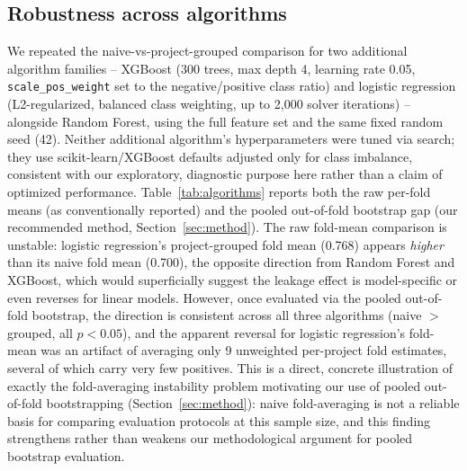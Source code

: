 \documentclass[preprint,12pt]{elsarticle}
\begin{document}
\subsection{Robustness across algorithms}
\label{sec:algcompare}
We repeated the naive-vs-project-grouped comparison for two additional algorithm families -- XGBoost (300 trees, max depth 4, learning rate 0.05, \texttt{scale\_pos\_weight} set to the negative/positive class ratio) and logistic regression (L2-regularized, balanced class weighting, up to 2{,}000 solver iterations) -- alongside Random Forest, using the full feature set and the same fixed random seed (42). Neither additional algorithm's hyperparameters were tuned via search; they use scikit-learn/XGBoost defaults adjusted only for class imbalance, consistent with our exploratory, diagnostic purpose here rather than a claim of optimized performance. Table~\ref{tab:algorithms} reports both the raw per-fold means (as conventionally reported) and the pooled out-of-fold bootstrap gap (our recommended method, Section~\ref{sec:method}). The raw fold-mean comparison is unstable: logistic regression's project-grouped fold mean (0.768) appears \emph{higher} than its naive fold mean (0.700), the opposite direction from Random Forest and XGBoost, which would superficially suggest the leakage effect is model-specific or even reverses for linear models. However, once evaluated via the pooled out-of-fold bootstrap, the direction is consistent across all three algorithms (naive $>$ grouped, all $p<0.05$), and the apparent reversal for logistic regression's fold-mean was an artifact of averaging only 9 unweighted per-project fold estimates, several of which carry very few positives. This is a direct, concrete illustration of exactly the fold-averaging instability problem motivating our use of pooled out-of-fold bootstrapping (Section~\ref{sec:method}): naive fold-averaging is not a reliable basis for comparing evaluation protocols at this sample size, and this finding strengthens rather than weakens our methodological argument for pooled bootstrap evaluation.

\begin{table}[htbp]
\centering
\caption{Algorithm comparison. ``Fold-mean'' columns are simple averages across per-fold AUCs (the conventional but, per Section~\ref{sec:algcompare}, unreliable method at this sample size); ``Pooled'' columns use out-of-fold predictions (our recommended method).}
\label{tab:algorithms}
\end{table}
\end{document}
